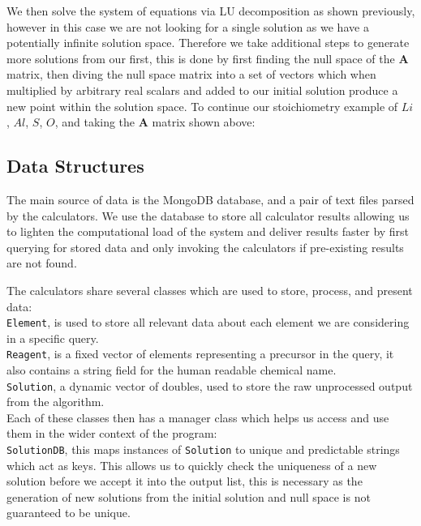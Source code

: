 We then solve the system of equations via LU decomposition as shown previously, however in this case we are not looking for a single solution as we have a potentially infinite solution space. Therefore we take additional steps to generate more solutions from our first, this is done by first finding the null space of the $\mathbf{A}$ matrix, then diving the null space matrix into a set of vectors which when multiplied by arbitrary real scalars and added to our initial solution produce a new point within the solution space. To continue our stoichiometry example of $Li$, $Al$, $S$, $O$, and taking the $\mathbf{A}$ matrix shown above:


\subsection{Data Structures}
The main source of data is the MongoDB database, and a pair of text files parsed by the calculators. We use the database to store all calculator results allowing us to lighten the computational load of the system and deliver results faster by first querying for stored data and only invoking the calculators if pre-existing results are not found.

The calculators share several classes which are used to store, process, and present data: \\

\texttt{Element}, is used to store all relevant data about each element we are considering in a specific query. \\

\texttt{Reagent}, is a fixed vector of elements representing a precursor in the query, it also contains a string field for the human readable chemical name. \\

\texttt{Solution}, a dynamic vector of doubles, used to store the raw unprocessed output from the algorithm.\\

Each of these classes then has a manager class which helps us access and use them in the wider context of the program: \\

\texttt{SolutionDB}, this maps instances of \texttt{Solution} to unique and predictable strings which act as keys. This allows us to quickly check the uniqueness of a new solution before we accept it into the output list, this is necessary as the generation of new solutions from the initial solution and null space is not guaranteed to be unique. \\

